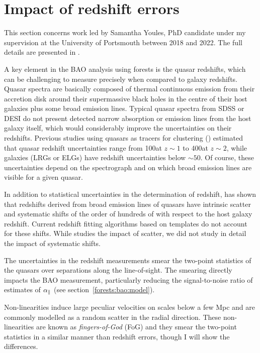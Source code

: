 \section{Impact of redshift errors}
\label{forests:zerrors}

This section concerns work led by Samantha Youles, PhD candidate under 
my supervision at the University of Portsmouth between 2018 and 2022. 
The full details are presented in \cite{youlesEffectQuasarRedshift2022}. 

A key element in the BAO analysis using forests is the quasar redshifts, 
which can be challenging to measure precisely when compared to galaxy redshifts. 
Quasar spectra are basically composed of thermal continuous emission 
from their accretion disk around their supermassive
black holes in the centre of their host galaxies plus some broad emission lines. 
Typical quasar spectra from SDSS or DESI do not present detected narrow absorption or 
emission lines from the host galaxy itself, which would considerably improve the 
uncertainties on their redshifts. Previous studies using quasars as tracers for 
clustering (\cite{zarroukClusteringSDSSIVExtended2018, lykeSloanDigitalSky2020}) 
estimated that quasar redshift uncertainties range from 
100\kms at $z\sim 1$ to 400\kms at $z\sim 2$, while galaxies (LRGs or ELGs) have 
redshift uncertainties below $\sim 50$\kms. Of course, these uncertainties 
depend on the spectrograph and on which broad emission lines are visible
for a given quasar. 

In addition to statistical uncertainties in the determination of redshift, 
\cite{shenSloanDigitalSky2016} has shown that redshifts derived from 
broad emission lines of quasars have intrinsic scatter and systematic shifts
of the order of hundreds of \kms with respect to the host galaxy redshift. 
Current redshift fitting algorithms based on templates do not account for these shifts. 
While \cite{youlesEffectQuasarRedshift2022} studies the impact of scatter, 
we did not study in detail the impact of systematic shifts. 


The uncertainties in the redshift measurements smear the two-point statistics 
of the quasars over separations along the line-of-sight. The smearing directly 
impacts the BAO measurement, particularly reducing the signal-to-noise ratio 
of estimates of ${\alpha_\parallel}$ (see section~\ref{forests:bao:model}). 

Non-linearities induce large peculiar velocities on scales below a few Mpc
and are commonly modelled as a random scatter in the radial direction.
These non-linearities are known as \emph{fingers-of-God} (FoG) and they smear
the two-point statistics in a similar manner than redshift errors, though 
I will show the differences. 

